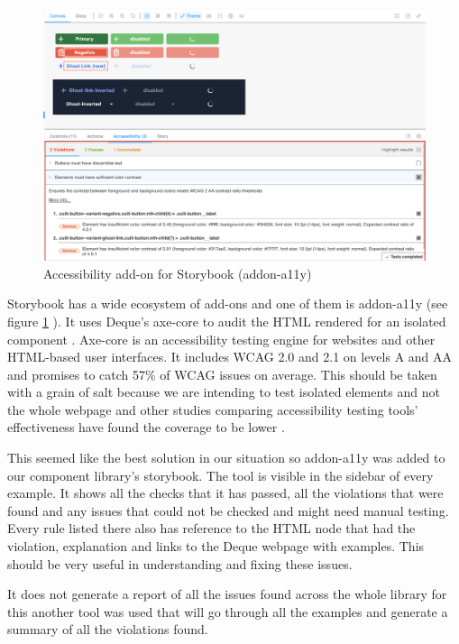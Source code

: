 \documentclass{master_thesis}
\begin{document}
\begin{figure}[h]
	\includegraphics[width=\textwidth]{img/addon-a11y.png}
	\caption{Accessibility add-on for Storybook (addon-a11y)}
	\label{fig:addon-a11y}
\end{figure}

Storybook has a wide ecosystem of add-ons and one of them is addon-a11y (see figure \ref{fig:addon-a11y} ). It uses Deque's axe-core to audit the HTML rendered for an isolated component \citep{addon-a11y}. Axe-core is an accessibility testing engine for websites and other HTML-based user interfaces. It includes WCAG 2.0 and 2.1 on levels A and AA and promises to catch 57\% of WCAG issues on average. \citep{Deque2023} This should be taken with a grain of salt because we are intending to test isolated elements and not the whole webpage and other studies comparing accessibility testing tools' effectiveness have found the coverage to be lower  .

This seemed like the best solution in our situation so addon-a11y was added to our component library’s storybook. The tool is visible in the sidebar of every example. It shows all the checks that it has passed, all the violations that were found and any issues that could not be checked and might need manual testing. Every rule listed there also has reference to the HTML node that had the violation, explanation and links to the Deque webpage with examples. This should be very useful in understanding and fixing these issues.

It does not generate a report of all the issues found across the whole library for this another tool was used that will go through all the examples and generate a summary of all the violations found.
\end{document}
